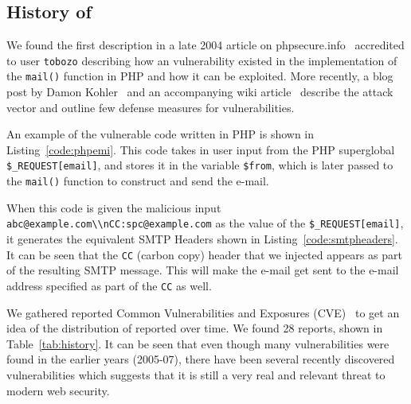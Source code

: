 \subsection{History of \ehi}

We found the first \ehi description in a late 2004 article on phpsecure.info~\cite{Tobozo} accredited to user \lstinline|tobozo| describing how an \ehi vulnerability existed in the implementation of the \texttt{mail()} function in PHP and how it can be exploited. More recently, a blog post by Damon Kohler~\cite{DK} and an accompanying wiki article~\cite{Injection} describe the attack vector and outline few defense measures for \ehi vulnerabilities.


An example of the vulnerable code written in PHP is shown in Listing~\ref{code:phpemi}. This code takes in user input from the PHP superglobal \texttt{\$\_REQUEST[\textquotesingle email\textquotesingle]}, and stores it in the variable \texttt{\$from}, which is later passed to the \texttt{mail()} function to construct and send the e-mail.



\begin{sloppypar}
When this code is given the malicious input \texttt{\lstinline{abc@example.com\\nCC:spc@example.com}} as the value of the \texttt{\$\_REQUEST[\textquotesingle email\textquotesingle]}, it generates the equivalent SMTP Headers shown in Listing~\ref{code:smtpheaders}. It can be seen that the \texttt{CC} (carbon copy) header that we injected appears as part of the resulting SMTP message. This will make the e-mail get sent to the e-mail address specified as part of the \texttt{CC} as well. 

%
\end{sloppypar}

We gathered reported Common Vulnerabilities and Exposures
(CVE)~\cite{cve} to get an idea of the distribution of
reported \ehi over time. We found 28 reports, shown in
Table~\ref*{tab:history}. It can be seen that even though many vulnerabilities were found in the earlier years (2005-07), there have been several recently discovered \ehi vulnerabilities which suggests that it is still a very real and relevant threat to modern web security.


